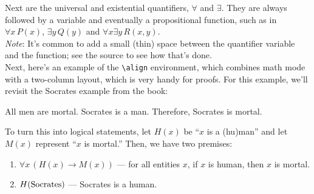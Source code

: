 \documentclass{article}
\begin{document}
Next are the universal and existential quantifiers, $\forall$ and $\exists$.
They are always followed by a variable and eventually a propositional function,
such as in $\forall x\,P(x)$, $\exists y\,Q(y)$ and $\forall x\exists y\,
R(x,y)$.\\
\emph{Note}\/: It's common to add a small (thin) space between the quantifier
variable and the function; see the source to see how that's done.\\

Next, here's an example of the {\tt \textbackslash align} environment, which
combines math mode with a two-column layout, which is very handy for proofs. For
this example, we'll revisit the Socrates example from the book:
\begin{center}
  All men are mortal. Socrates is a man. Therefore, Socrates is mortal.
\end{center}

To turn this into logical statements, let $H(x)$ be ``$x$ is a (hu)man'' and let
$M(x)$ represent ``$x$ is mortal.'' Then, we have two premises:
\begin{enumerate}
  \item $\forall x\,(H(x)\to M(x))$ --- for all entities $x$, if $x$ is human,
  then $x$ is mortal.
  \item $H({\rm Socrates})$ --- Socrates is a human.
\end{enumerate}
\end{document}
